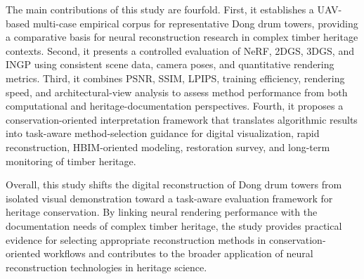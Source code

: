 The main contributions of this study are fourfold. First, it establishes
a UAV-based multi-case empirical corpus for representative Dong drum
towers, providing a comparative basis for neural reconstruction research
in complex timber heritage contexts. Second, it presents a controlled
evaluation of NeRF, 2DGS, 3DGS, and INGP using consistent scene data,
camera poses, and quantitative rendering metrics. Third, it combines
PSNR, SSIM, LPIPS, training efficiency, rendering speed, and
architectural-view analysis to assess method performance from both
computational and heritage-documentation perspectives. Fourth, it
proposes a conservation-oriented interpretation framework that
translates algorithmic results into task-aware method-selection guidance
for digital visualization, rapid reconstruction, HBIM-oriented modeling,
restoration survey, and long-term monitoring of timber heritage.

Overall, this study shifts the digital reconstruction of Dong drum
towers from isolated visual demonstration toward a task-aware evaluation
framework for heritage conservation. By linking neural rendering
performance with the documentation needs of complex timber heritage, the
study provides practical evidence for selecting appropriate
reconstruction methods in conservation-oriented workflows and
contributes to the broader application of neural reconstruction
technologies in heritage science.


